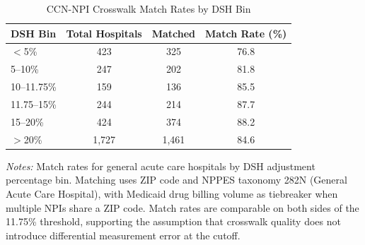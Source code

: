 \documentclass[12pt]{article}
\begin{document}
\begin{table}[H]
\centering
\caption{CCN-NPI Crosswalk Match Rates by DSH Bin}
\label{tab:crosswalk}
\begin{tabular}{lccc}
\toprule
DSH Bin & Total Hospitals & Matched & Match Rate (\%) \\
\midrule
$<$5\% & 423 & 325 & 76.8 \\
5--10\% & 247 & 202 & 81.8 \\
10--11.75\% & 159 & 136 & 85.5 \\
11.75--15\% & 244 & 214 & 87.7 \\
15--20\% & 424 & 374 & 88.2 \\
$>$20\% & 1,727 & 1,461 & 84.6 \\
\bottomrule
\end{tabular}
\begin{minipage}{\linewidth}
\vspace{0.3em}
\small\textit{Notes:} Match rates for general acute care hospitals by DSH adjustment percentage bin. Matching uses ZIP code and NPPES taxonomy 282N (General Acute Care Hospital), with Medicaid drug billing volume as tiebreaker when multiple NPIs share a ZIP code. Match rates are comparable on both sides of the 11.75\% threshold, supporting the assumption that crosswalk quality does not introduce differential measurement error at the cutoff.
\end{minipage}
\end{table}
\end{document}
